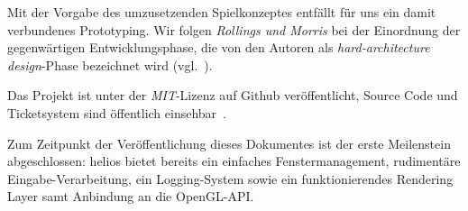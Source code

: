 \noindent
Mit der Vorgabe des umzusetzenden Spielkonzeptes entfällt für uns ein damit verbundenes Prototyping.
Wir folgen \textit{Rollings und Morris} bei der Einordnung der gegenwärtigen Entwicklungsphase, die von den Autoren als \textit{hard-architecture design}-Phase bezeichnet wird (vgl.~\cite[628]{RM04}).\par

Das Projekt ist unter der \textit{MIT}-Lizenz  auf Github veröffentlicht, Source Code und Ticketsystem sind öffentlich einsehbar~\cite[]{heliosgithub}.\par

Zum Zeitpunkt der Veröffentlichung dieses Dokumentes ist der erste Meilenstein abgeschlossen: helios bietet bereits ein einfaches Fenstermanagement, rudimentäre Eingabe-Verarbeitung, ein Logging-System sowie ein funktionierendes Rendering Layer samt Anbindung an die OpenGL-API.

